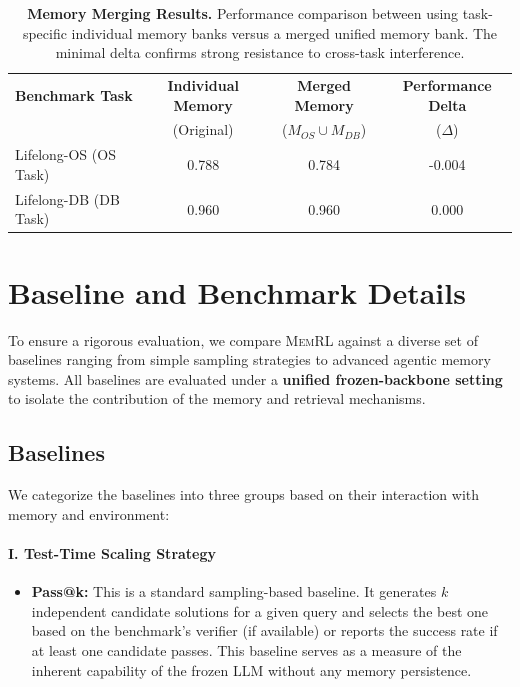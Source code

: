 \documentclass{article}
\theoremstyle{plain}
\theoremstyle{definition}
\theoremstyle{remark}
\begin{document}
\begin{table}[H]
    \centering
    \small
    \caption{\textbf{Memory Merging Results.} Performance comparison between using task-specific individual memory banks versus a merged unified memory bank. The minimal delta confirms strong resistance to cross-task interference.}
    \label{tab:memory_merge}
    \setlength{\tabcolsep}{8pt}
    \begin{tabular}{l c c c}
        \toprule
        \textbf{Benchmark Task} & \textbf{Individual Memory} & \textbf{Merged Memory} & \textbf{Performance Delta} \\
        & (Original) & ($M_{OS} \cup M_{DB}$) & ($\Delta$) \\
        \midrule
        Lifelong-OS (OS Task) & 0.788 & 0.784 & -0.004 \\
        Lifelong-DB (DB Task) & 0.960 & 0.960 & \phantom{-}0.000 \\
        \bottomrule
    \end{tabular}
\end{table}

\section{Baseline and Benchmark Details}
\label{app:baseline_benchmark_details}

To ensure a rigorous evaluation, we compare \textsc{MemRL} against a diverse set of baselines ranging from simple sampling strategies to advanced agentic memory systems. All baselines are evaluated under a \textbf{unified frozen-backbone setting} to isolate the contribution of the memory and retrieval mechanisms.

\subsection{Baselines}
\label{app:baselines}
We categorize the baselines into three groups based on their interaction with memory and environment:

\paragraph{I. Test-Time Scaling Strategy}
\begin{itemize}
    \item \textbf{Pass@k:} This is a standard sampling-based baseline. It generates $k$ independent candidate solutions for a given query and selects the best one based on the benchmark's verifier (if available) or reports the success rate if at least one candidate passes. This baseline serves as a measure of the inherent capability of the frozen LLM without any memory persistence.
\end{itemize}
\end{document}
